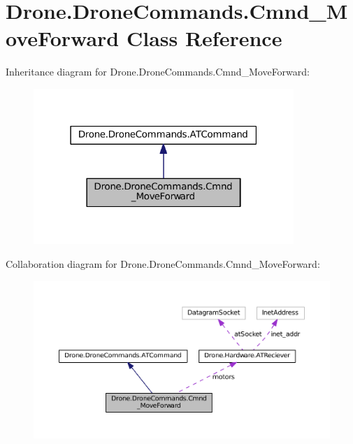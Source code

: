 \hypertarget{class_drone_1_1_drone_commands_1_1_cmnd___move_forward}{}\section{Drone.\+Drone\+Commands.\+Cmnd\+\_\+\+Move\+Forward Class Reference}
\label{class_drone_1_1_drone_commands_1_1_cmnd___move_forward}


Inheritance diagram for Drone.\+Drone\+Commands.\+Cmnd\+\_\+\+Move\+Forward\+:\nopagebreak
\begin{figure}[H]
\begin{center}
\leavevmode
\includegraphics[width=279pt]{class_drone_1_1_drone_commands_1_1_cmnd___move_forward__inherit__graph}
\end{center}
\end{figure}


Collaboration diagram for Drone.\+Drone\+Commands.\+Cmnd\+\_\+\+Move\+Forward\+:\nopagebreak
\begin{figure}[H]
\begin{center}
\leavevmode
\includegraphics[width=350pt]{class_drone_1_1_drone_commands_1_1_cmnd___move_forward__coll__graph}
\end{center}
\end{figure}
